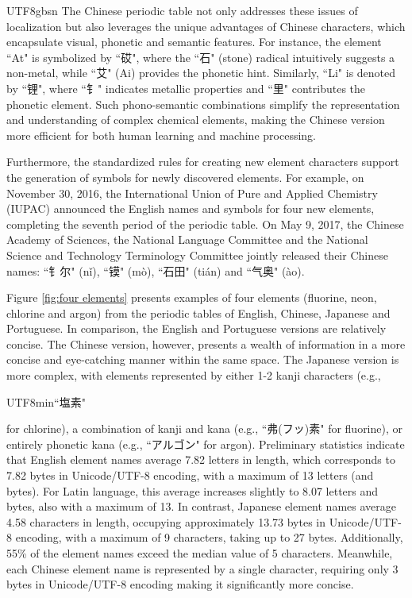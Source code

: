 \documentclass[conference]{IEEEtran}
\begin{document}
\begin{CJK*}{UTF8}{gbsn}
The Chinese periodic table not only addresses these issues of localization but also leverages the unique advantages of Chinese characters, which encapsulate visual, phonetic and semantic features. For instance, the element “At" is symbolized by “砹", where the “石" (stone) radical intuitively suggests a non-metal, while “艾" (Ai) provides the phonetic hint. Similarly, “Li" is denoted by “锂", where “钅" indicates metallic properties and “里" contributes the phonetic element. Such phono-semantic combinations simplify the representation and understanding of complex chemical elements, making the Chinese version more efficient for both human learning and machine processing.

Furthermore, the standardized rules for creating new element characters support the generation of symbols for newly discovered elements. For example, on November 30, 2016, the International Union of Pure and Applied Chemistry (IUPAC) announced the English names and symbols for four new elements, completing the seventh period of the periodic table. On May 9, 2017, the Chinese Academy of Sciences, the National Language Committee and the National Science and Technology Terminology Committee jointly released their Chinese names: “钅尔" (nǐ), “镆" (mò), “石田" (tián) and “气奥" (ào).

Figure \ref{fig:four elements} presents examples of four elements (fluorine, neon, chlorine and argon) from the periodic tables of English, Chinese, Japanese and Portuguese. In comparison, the English and Portuguese versions are relatively concise. The Chinese version, however, presents a wealth of information in a more concise and eye-catching manner within the same space. The Japanese version is more complex, with elements represented by either 1-2 kanji characters (e.g., \begin{CJK*}{UTF8}{min}“塩素"\end{CJK*} for chlorine), a combination of kanji and kana (e.g., “弗(フッ)素" for fluorine), or entirely phonetic kana (e.g., “アルゴン" for argon). 
Preliminary statistics indicate that English element names average 7.82 letters in length, which corresponds to 7.82 bytes in Unicode/UTF-8 encoding, with a maximum of 13 letters (and bytes). For Latin language, this average increases slightly to 8.07 letters and bytes, also with a maximum of 13. In contrast, Japanese element names average 4.58 characters in length, occupying approximately 13.73 bytes in Unicode/UTF-8 encoding, with a maximum of 9 characters, taking up to 27 bytes. Additionally, 55\% of the element names exceed the median value of 5 characters. Meanwhile, each Chinese element name is represented by a single character, requiring only 3 bytes in Unicode/UTF-8 encoding making it significantly more concise.


\end{CJK*}
\end{document}
